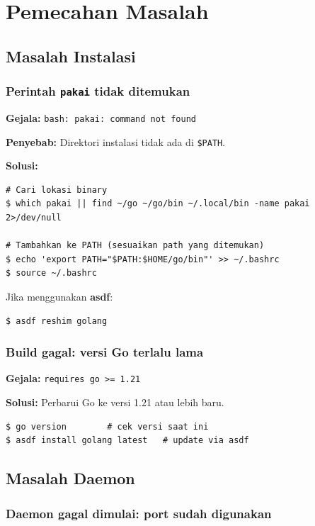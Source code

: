\chapter{Pemecahan Masalah}

\section{Masalah Instalasi}

\subsection{Perintah \texttt{pakai} tidak ditemukan}

\textbf{Gejala:} \texttt{bash: pakai: command not found}

\textbf{Penyebab:} Direktori instalasi tidak ada di \texttt{\$PATH}.

\textbf{Solusi:}
\begin{lstlisting}[style=terminal]
# Cari lokasi binary
$ which pakai || find ~/go ~/go/bin ~/.local/bin -name pakai 2>/dev/null

# Tambahkan ke PATH (sesuaikan path yang ditemukan)
$ echo 'export PATH="$PATH:$HOME/go/bin"' >> ~/.bashrc
$ source ~/.bashrc
\end{lstlisting}

Jika menggunakan \textbf{asdf}:
\begin{lstlisting}[style=terminal]
$ asdf reshim golang
\end{lstlisting}

\subsection{Build gagal: versi Go terlalu lama}

\textbf{Gejala:} \texttt{requires go >= 1.21}

\textbf{Solusi:} Perbarui Go ke versi 1.21 atau lebih baru.
\begin{lstlisting}[style=terminal]
$ go version        # cek versi saat ini
$ asdf install golang latest   # update via asdf
\end{lstlisting}

\section{Masalah Daemon}

\subsection{Daemon gagal dimulai: port sudah digunakan}

